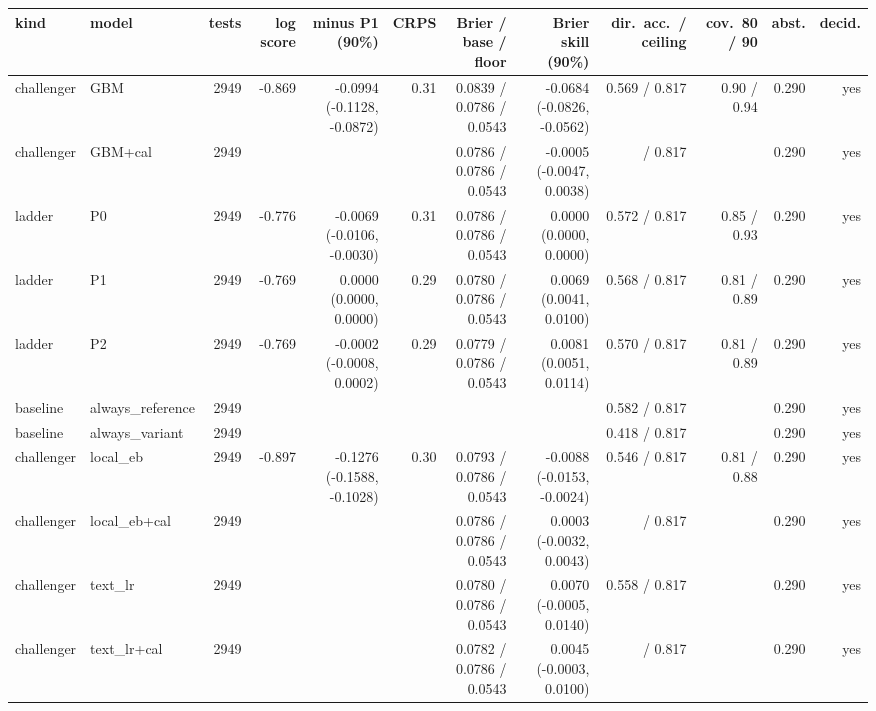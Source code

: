 \begin{tabular}{llrrrrrrrrrr}
\toprule
kind & model & tests & log score & minus P1 (90\%) & CRPS & Brier / base / floor & Brier skill (90\%) & dir.\ acc.\ / ceiling & cov.\ 80 / 90 & abst. & decid. \\
\midrule
challenger & GBM & 2949 & -0.869 & -0.0994 (-0.1128, -0.0872) & 0.31 & 0.0839 / 0.0786 / 0.0543 & -0.0684 (-0.0826, -0.0562) & 0.569 / 0.817 & 0.90 / 0.94 & 0.290 & yes \\
challenger & GBM+cal & 2949 &  &  &  & 0.0786 / 0.0786 / 0.0543 & -0.0005 (-0.0047, 0.0038) &  / 0.817 &  & 0.290 & yes \\
ladder & P0 & 2949 & -0.776 & -0.0069 (-0.0106, -0.0030) & 0.31 & 0.0786 / 0.0786 / 0.0543 & 0.0000 (0.0000, 0.0000) & 0.572 / 0.817 & 0.85 / 0.93 & 0.290 & yes \\
ladder & P1 & 2949 & -0.769 & 0.0000 (0.0000, 0.0000) & 0.29 & 0.0780 / 0.0786 / 0.0543 & 0.0069 (0.0041, 0.0100) & 0.568 / 0.817 & 0.81 / 0.89 & 0.290 & yes \\
ladder & P2 & 2949 & -0.769 & -0.0002 (-0.0008, 0.0002) & 0.29 & 0.0779 / 0.0786 / 0.0543 & 0.0081 (0.0051, 0.0114) & 0.570 / 0.817 & 0.81 / 0.89 & 0.290 & yes \\
baseline & always\_reference & 2949 &  &  &  &  &  & 0.582 / 0.817 &  & 0.290 & yes \\
baseline & always\_variant & 2949 &  &  &  &  &  & 0.418 / 0.817 &  & 0.290 & yes \\
challenger & local\_eb & 2949 & -0.897 & -0.1276 (-0.1588, -0.1028) & 0.30 & 0.0793 / 0.0786 / 0.0543 & -0.0088 (-0.0153, -0.0024) & 0.546 / 0.817 & 0.81 / 0.88 & 0.290 & yes \\
challenger & local\_eb+cal & 2949 &  &  &  & 0.0786 / 0.0786 / 0.0543 & 0.0003 (-0.0032, 0.0043) &  / 0.817 &  & 0.290 & yes \\
challenger & text\_lr & 2949 &  &  &  & 0.0780 / 0.0786 / 0.0543 & 0.0070 (-0.0005, 0.0140) & 0.558 / 0.817 &  & 0.290 & yes \\
challenger & text\_lr+cal & 2949 &  &  &  & 0.0782 / 0.0786 / 0.0543 & 0.0045 (-0.0003, 0.0100) &  / 0.817 &  & 0.290 & yes \\
\bottomrule
\end{tabular}
